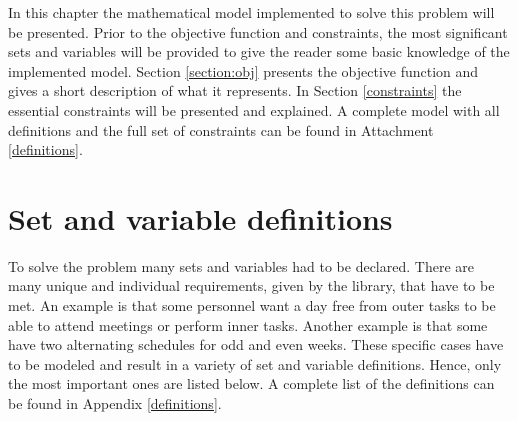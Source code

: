In this chapter the mathematical model implemented to solve this problem will be presented. Prior to the objective function and constraints, the most significant sets and variables will be provided to give the reader some basic knowledge of the implemented model. Section \ref{section:obj} presents the objective function and gives a short description of what it represents. In Section \ref{constraints} the essential constraints will be presented and explained. A complete model with all definitions and the full set of constraints can be found in Attachment \ref{definitions}. %
\section{Set and variable definitions} \label{variables}
To solve the problem many sets and variables had to be declared. There are many unique and individual requirements, given by the library, that have to be met. An example is that some personnel want a day free from outer tasks to be able to attend meetings or perform inner tasks. Another example is that some have two alternating schedules for odd and even weeks. These specific cases have to be modeled and result in a variety of set and variable definitions. Hence, only the most important ones are listed below. A complete list of the definitions can be found in Appendix \ref{definitions}. \\
 \\
  \\
	 	\\
                                                                \\
                                                       \\
                                                   \\
                                                \\

